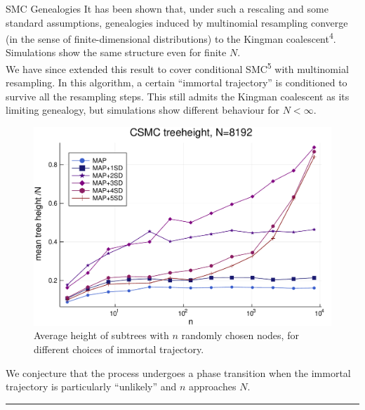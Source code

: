 \documentclass[final, 12pt]{beamer}
\newlength{\colwidth}
\begin{document}
\begin{frame}
\begin{columns}
\begin{column}{\colwidth}
\begin{block}{SMC Genealogies}
It has been shown that, under such a rescaling and some standard assumptions, genealogies induced by multinomial resampling converge (in the sense of finite-dimensional distributions) to the Kingman coalescent\textsuperscript{4}. Simulations show the same structure even for finite $N$.\\[10pt]

We have since extended this result to cover conditional SMC\textsuperscript{5} with multinomial resampling. In this algorithm, a certain ``immortal trajectory'' is conditioned to survive all the resampling steps. This still admits the Kingman coalescent as its limiting genealogy, but simulations show different behaviour for $N<\infty$.\\[10pt]
\begin{figure}
\includegraphics[width=\colwidth]{../CSMC_treeheight_500reps.pdf}
\caption{Average height of subtrees with $n$ randomly chosen nodes, for different choices of immortal trajectory.}
\end{figure}
We conjecture that the process undergoes a phase transition when the immortal trajectory is particularly ``unlikely'' and $n$ approaches $N$.
\end{block}

\vspace*{20pt}
\hrule
\begin{block}

\vspace*{-30pt}


\end{block}
\end{column}
\end{columns}
\end{frame}
\end{document}

